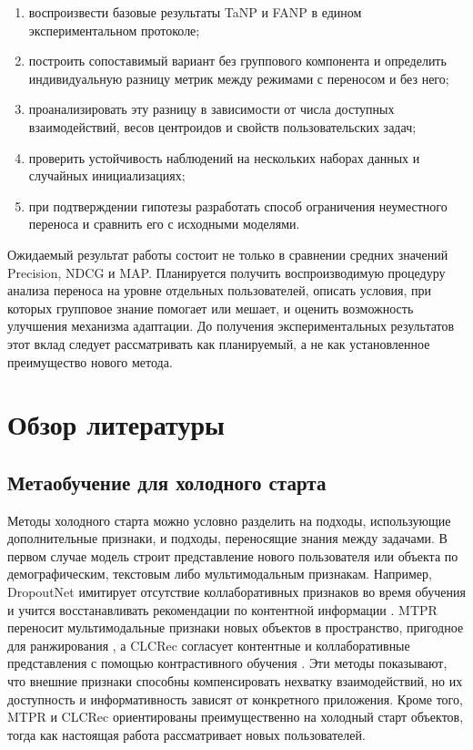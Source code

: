 \documentclass[12pt,a4paper]{article}
\begin{document}
\begin{enumerate}[label=\arabic*)]
    \item воспроизвести базовые результаты TaNP и FANP в едином
    экспериментальном протоколе;
    \item построить сопоставимый вариант без группового компонента и определить
    индивидуальную разницу метрик между режимами с переносом и без него;
    \item проанализировать эту разницу в зависимости от числа доступных
    взаимодействий, весов центроидов и свойств пользовательских задач;
    \item проверить устойчивость наблюдений на нескольких наборах данных и
    случайных инициализациях;
    \item при подтверждении гипотезы разработать способ ограничения
    неуместного переноса и сравнить его с исходными моделями.
\end{enumerate}

Ожидаемый результат работы состоит не только в сравнении средних значений
Precision, NDCG и MAP. Планируется получить воспроизводимую процедуру анализа
переноса на уровне отдельных пользователей, описать условия, при которых
групповое знание помогает или мешает, и оценить возможность улучшения
механизма адаптации. До получения экспериментальных результатов этот вклад
следует рассматривать как планируемый, а не как установленное преимущество
нового метода.

\section{Обзор литературы}

\subsection{Метаобучение для холодного старта}

Методы холодного старта можно условно разделить на подходы, использующие
дополнительные признаки, и подходы, переносящие знания между задачами. В первом
случае модель строит представление нового пользователя или объекта по
демографическим, текстовым либо мультимодальным признакам. Например,
DropoutNet имитирует отсутствие коллаборативных признаков во время обучения и
учится восстанавливать рекомендации по контентной информации
\citep{volkovs2017dropoutnet}. MTPR переносит мультимодальные признаки новых
объектов в пространство, пригодное для ранжирования \citep{du2020mtpr}, а
CLCRec согласует контентные и коллаборативные представления с помощью
контрастивного обучения \citep{wei2021clcrec}. Эти методы показывают, что
внешние признаки способны компенсировать нехватку взаимодействий, но их
доступность и информативность зависят от конкретного приложения. Кроме того,
MTPR и CLCRec ориентированы преимущественно на холодный старт объектов, тогда
как настоящая работа рассматривает новых пользователей.
\end{document}
